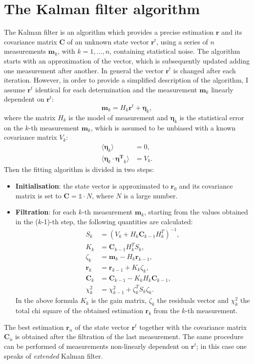 \documentclass[b5paper,10pt,twoside,oldstyle,classica]{toptesi}
\begin{document}
\section{The Kalman filter algorithm}
The Kalman filter is an algorithm which provides a precise estimation $\pmb{r}$ and its covariance matrix $\pmb{C}$ of an unknown state vector $\pmb{r}^t$, using a series of $n$ measurements $\pmb{m}_k$, with $k=1,...,n$, containing statistical noise. The algorithm starts with an approximation of the vector, which is subsequently updated adding one measurement after another. In general the vector $\pmb{r}^t$ is changed after each iteration. However, in order to provide a simplified description of the algorithm, I assume $\pmb{r}^t$ identical for each determination and the measurement $\pmb{m}_k$ linearly dependent on $\pmb{r}^t$:
\begin{equation}
 \pmb{m}_k = H_{k}\pmb{r}^t+\pmb{\eta}_k,
\end{equation}
where the matrix $H_k$ is the model of measurement and $\pmb{\eta}_k$ is the statistical error on the $k$-th measurement $\pmb{m}_k$, which is assumed to be unbiased with a known covariance matrix $V_k$:
\begin{equation}
\begin{split}
\langle \pmb{\eta}_k \rangle &= 0,\\
\langle \pmb{\eta}_k\cdot\pmb{\eta^T}_k \rangle &= V_k.
\end{split}
\end{equation}
Then the fitting algorithm is divided in two steps:
\begin{itemize}
 \item \textbf{Initialisation}: the state vector is approximated to $\pmb{r}_0$ and its covariance matrix is set to $\pmb{C} = \mathbb{1}\cdot N$, where $N$ is a large number. 
 \item \textbf{Filtration}: for each $k$-th measurement $\pmb{m}_k$, starting from the values obtained in the ($k$-1)-th step, the following quantities are calculated:
 \begin{equation}
\begin{split}
S_k &= (V_k+H_k\pmb{C}_{k-1}H_k^T)^{-1}, \\
K_k &= \pmb{C}_{k-1}H_k^TS_k, \\
\zeta_k &= \pmb{m}_k - H_k\pmb{r}_{k-1}, \\
\pmb{r}_k &= \pmb{r}_{k-1}+K_k\zeta_k, \\
\pmb{C}_k &= \pmb{C}_{k-1}-K_kH_k\pmb{C}_{k-1}, \\
\chi^2_k &= \chi^2_{k-1}+\zeta^T_kS_k\zeta_k.
\end{split}
\end{equation}
In the above formula $K_k$ is the gain matrix, $\zeta_k$ the residuals vector and $\chi^2_k$ the total chi square of the obtained estimation $\pmb{r}_k$ from the $k$-th measurement.  
\end{itemize}
The best estimation $\pmb{r}_n$ of the state vector $\pmb{r}^t$ together with the covariance matrix $\pmb{C}_n$ is obtained after the filtration of the last measurement. The same procedure can be performed of measurements non-linearly dependent on $\pmb{r}^t$; in this case one speaks of \textit{extended} Kalman filter. 
\end{document}
